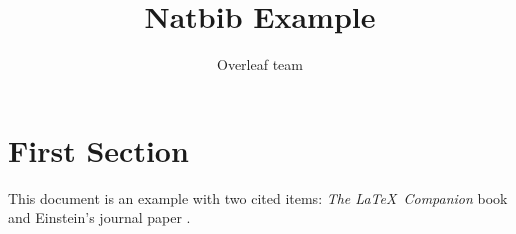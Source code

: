 \documentclass{article}
\title{Natbib Example}
\author{Overleaf team}
\begin{document}
	
	\maketitle
	
	\section{First Section}
	This document is an example with two cited items: \textit{The \LaTeX\ Companion} book \citet{ge:2011} and Einstein's journal paper \citep{ba-le-mi-ro:2003}. 
	
	
	
%	
	
	
\end{document}
